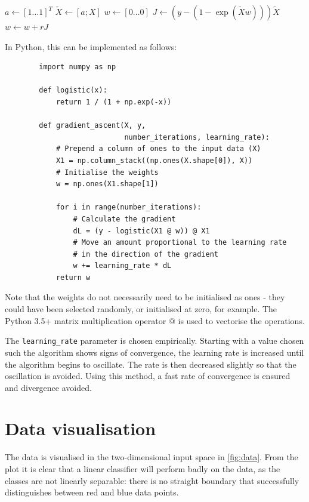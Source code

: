 \documentclass[a4paper]{article}
\begin{document}
    \begin{algorithmic}[1]
            \State $a \gets [1 \dots 1]^T$
            \State $\tilde{X} \gets [a ; X]$
            \State $w \gets [0 \dots 0]$
                \State $J \gets (y - (1 - \exp(\tilde{X} w))) \tilde{X}$
                \State $w \gets w + rJ$
            \EndFor
        \EndProcedure
    \end{algorithmic}

    In Python, this can be implemented as follows:

    \begin{verbatim}
        import numpy as np

        def logistic(x):
            return 1 / (1 + np.exp(-x))

        def gradient_ascent(X, y,
                            number_iterations, learning_rate):
            # Prepend a column of ones to the input data (X)
            X1 = np.column_stack((np.ones(X.shape[0]), X))
            # Initialise the weights
            w = np.ones(X1.shape[1])

            for i in range(number_iterations):
                # Calculate the gradient
                dL = (y - logistic(X1 @ w)) @ X1
                # Move an amount proportional to the learning rate
                # in the direction of the gradient
                w += learning_rate * dL
            return w
    \end{verbatim}

    Note that the weights do not necessarily need to be initialised as ones - they could have been selected randomly, or
    initialised at zero, for example. The Python 3.5+ matrix multiplication operator $@$ is used to vectorise the
    operations.

    The \verb`learning_rate` parameter is chosen empirically. Starting with a value chosen such the algorithm shows signs
    of convergence, the learning rate is increased until the algorithm begins to oscillate. The rate is then decreased
    slightly so that the oscillation is avoided. Using this method, a fast rate of convergence is ensured and divergence
    avoided.

    \section{Data visualisation}\label{sec:data-visualisation}
    The data is visualised in the two-dimensional input space in \autoref{fig:data}. From the plot it is clear that a
    linear classifier will perform badly on the data, as the classes are not linearly separable: there is no straight
    boundary that successfully distinguishes between red and blue data points.
\end{document}
